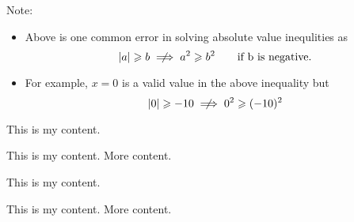 \begin{tcbraster}[standard,raster equal height,raster columns=2,
colback=LightGreen,colframe=DarkGreen,colbacktitle=LimeGreen!75!DarkGreen,
left=1mm,right=1mm,top=1mm,bottom=1mm,middle=1mm]
\begin{tcolorbox}
\tcbline


Note:
\begin{itemize}
       \item[] Above is one common error in solving absolute value inequlities as 
                \[    \lvert a \rvert \geqslant b       \centernot\implies     a^2 \geqslant b^2  \quad  \quad \text{if b is negative.} \]    
    
      \item[]  For example, $x=0$ is a valid value in the above inequality but
                \[     \lvert 0 \rvert \geqslant -10       \centernot\implies     0^2 \geqslant (-10)^2 \] 
\end{itemize}
\end{tcolorbox}

\begin{tcolorbox}
This is my content.
\end{tcolorbox}
\begin{tcolorbox}
This is my content.
\tcblower
More content.
\end{tcolorbox}
\begin{tcolorbox}[adjusted title=My title]
This is my content.
\end{tcolorbox}
\begin{tcolorbox}[adjusted title=My title]
This is my content.
\tcblower
More content.
\end{tcolorbox}
\end{tcbraster}




